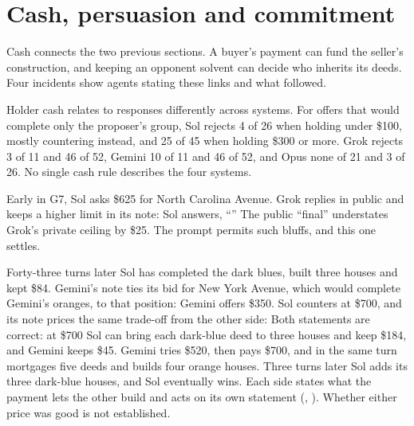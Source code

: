 \section{Cash, persuasion and commitment}
\label{sec:conduct}

Cash connects the two previous sections. A buyer's payment can fund the seller's construction, and keeping an opponent solvent can decide who inherits its deeds. Four incidents show agents stating these links and what followed.

Holder cash relates to responses differently across systems. For offers that would complete only the proposer's group, Sol rejects 4 of 26 when holding under \$100, mostly countering instead, and 25 of 45 when holding \$300 or more. Grok rejects 3 of 11 and 46 of 52, Gemini 10 of 11 and 46 of 52, and Opus none of 21 and 3 of 26. No single cash rule describes the four systems.

Early in G7, Sol asks \$625 for North Carolina Avenue. Grok replies in public and keeps a higher limit in its note:
Sol answers, ``'' The public ``final'' understates Grok's private ceiling by \$25. The prompt permits such bluffs, and this one settles.

Forty-three turns later Sol has completed the dark blues, built three houses and kept \$84. Gemini's note ties its bid for New York Avenue, which would complete Gemini's oranges, to that position:
Gemini offers \$350. Sol counters at \$700, and its note prices the same trade-off from the other side:
Both statements are correct: at \$700 Sol can bring each dark-blue deed to three houses and keep \$184, and Gemini keeps \$45. Gemini tries \$520, then pays \$700, and in the same turn mortgages five deeds and builds four orange houses. Three turns later Sol adds its three dark-blue houses, and Sol eventually wins. Each side states what the payment lets the other build and acts on its own statement (, ). Whether either price was good is not established.

